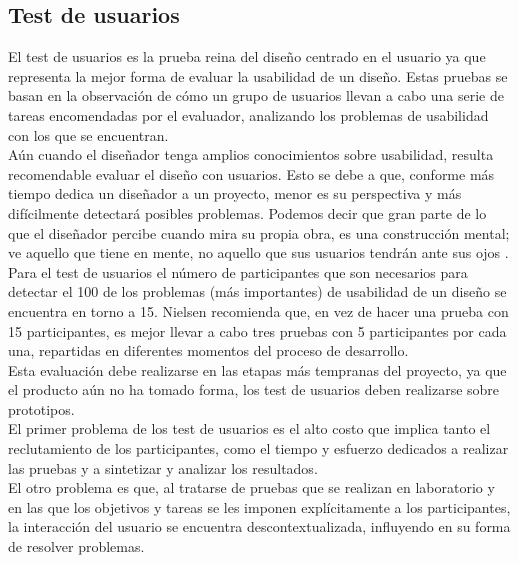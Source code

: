 \subsection{Test de usuarios}
El test de usuarios es la prueba reina del diseño centrado en el usuario ya que representa la mejor forma de evaluar la usabilidad de un diseño. Estas pruebas se basan en la observación de cómo un grupo de usuarios llevan a cabo una serie de tareas encomendadas por el evaluador, analizando los problemas de usabilidad con los que se encuentran.\\
Aún cuando el diseñador tenga amplios conocimientos sobre usabilidad, resulta recomendable evaluar el diseño con usuarios. Esto se debe a que, conforme más tiempo dedica un diseñador a un proyecto, menor es su perspectiva y más difícilmente detectará posibles problemas. Podemos decir que gran parte de lo que el diseñador percibe cuando mira su propia obra, es una construcción mental; ve aquello que tiene en mente, no aquello que sus usuarios tendrán ante sus ojos \cite{hassan2003metodo}.\\
Para el test de usuarios el número de participantes que son necesarios para detectar el 100 de los problemas (más importantes) de usabilidad de un diseño se encuentra en torno a 15. Nielsen  recomienda que, en vez de hacer una prueba con 15 participantes, es mejor llevar a cabo tres pruebas con 5 participantes por cada una, repartidas en diferentes momentos del proceso de desarrollo.\\
Esta evaluación debe realizarse en las etapas más tempranas del proyecto, ya que el producto aún no ha tomado forma, los test de usuarios deben realizarse sobre prototipos.\\
El primer problema de los test de usuarios es el alto costo que implica tanto el reclutamiento de los participantes, como el tiempo y esfuerzo dedicados a realizar las pruebas y a sintetizar y analizar los resultados.\\ 
El otro problema es que, al tratarse de pruebas que se realizan en laboratorio y en las que los objetivos y tareas se les imponen explícitamente a los participantes, la interacción del usuario se encuentra descontextualizada, influyendo en su forma de resolver problemas.
